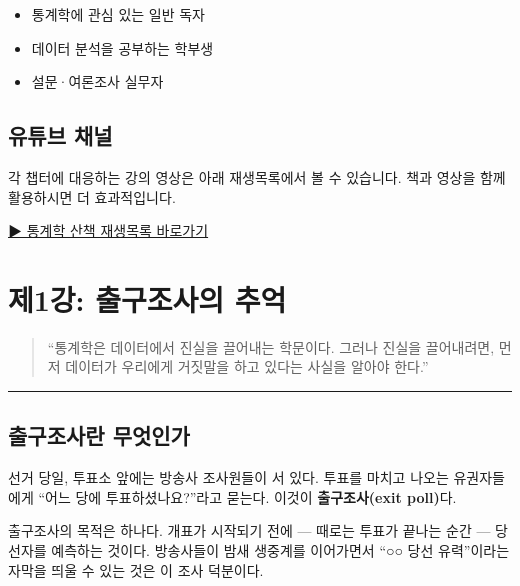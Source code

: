 \documentclass[
  letterpaper,
  DIV=11,
  numbers=noendperiod]{scrreprt}
\providecommand{\tightlist}{%
  \setlength{\itemsep}{0pt}\setlength{\parskip}{0pt}}
\begin{document}

\begin{itemize}
\tightlist
\item
  통계학에 관심 있는 일반 독자
\item
  데이터 분석을 공부하는 학부생
\item
  설문·여론조사 실무자
\end{itemize}

\section*{유튜브 채널}\label{uxc720uxd29cuxbe0c-uxcc44uxb110}


각 챕터에 대응하는 강의 영상은 아래 재생목록에서 볼 수 있습니다. 책과
영상을 함께 활용하시면 더 효과적입니다.

\href{https://youtube.com/playlist?list=PLpX4d5n0gRfQe0RpCR-jH8b4o0iHPeXaa&si=4MVFil9Cb7rMbr6n}{▶
통계학 산책 재생목록 바로가기}


\chapter{제1강: 출구조사의
추억}\label{uxc81c1uxac15-uxcd9cuxad6cuxc870uxc0acuxc758-uxcd94uxc5b5}

\begin{quote}
``통계학은 데이터에서 진실을 끌어내는 학문이다. 그러나 진실을
끌어내려면, 먼저 데이터가 우리에게 거짓말을 하고 있다는 사실을 알아야
한다.''
\end{quote}

\begin{center}\rule{0.5\linewidth}{0.5pt}\end{center}

\section{출구조사란
무엇인가}\label{uxcd9cuxad6cuxc870uxc0acuxb780-uxbb34uxc5c7uxc778uxac00}

선거 당일, 투표소 앞에는 방송사 조사원들이 서 있다. 투표를 마치고 나오는
유권자들에게 ``어느 당에 투표하셨나요?''라고 묻는다. 이것이
\textbf{출구조사(exit poll)}다.

출구조사의 목적은 하나다. 개표가 시작되기 전에 --- 때로는 투표가 끝나는
순간 --- 당선자를 예측하는 것이다. 방송사들이 밤새 생중계를 이어가면서
``○○ 당선 유력''이라는 자막을 띄울 수 있는 것은 이 조사 덕분이다.
\end{document}
